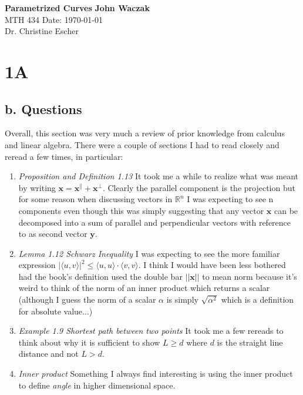 \documentclass[a4paper, 11pt]{article}
\begin{document}
\noindent
\large\textbf{Parametrized Curves} \hfill \textbf{John Waczak} \\
\normalsize MTH 434 \hfill  Date: \today \\
Dr. Christine Escher \\

\section*{1A}
	\subsection*{b. Questions}
	Overall, this section was very much a review of prior knowledge from calculus and linear algebra. There were a couple of sections I had to read closely and reread a few times, in particular: 
		\begin{enumerate}
			\item \textit{Proposition and Definition 1.13}
			It took me a while to realize what was meant by writing $\mathbf{x} = \mathbf{x}^{\parallel}+\mathbf{x}^{\perp}$. Clearly the parallel component is the projection but for some reason when discussing vectors in $\mathbb{R}^n$ I was expecting to see n components even though this was simply suggesting that any vector $\mathbf{x}$ can be decomposed into a sum of parallel and perpendicular vectors with reference to as second vector $\mathbf{y}$. 
			
			\item \textit{Lemma 1.12 Schwarz Inequality}
			I was expecting to see the more familiar expression $|\langle u, v\rangle|^2 \leq \langle u,u \rangle \cdot \langle v,v \rangle$. I think I would have been less bothered had the book's definition used the double bar $||\mathbf{x}||$ to mean norm because it's weird to think of the norm of an inner product which returns a scalar (although I guess the norm of a scalar $\alpha$ is simply $\sqrt{\alpha^2}$ which is a definition for absolute value...)
			
			\item \textit{Example 1.9 Shortest path between two points}
			It took me a few rereads to think about why it is sufficient to show $L \ge d$ where $d$ is the straight line distance and not $L > d$. 
			
			\item \textit{Inner product}
			Something I always find interesting is using the inner product to define \textit{angle} in higher dimensional space. 
		\end{enumerate}
	
\end{document}
